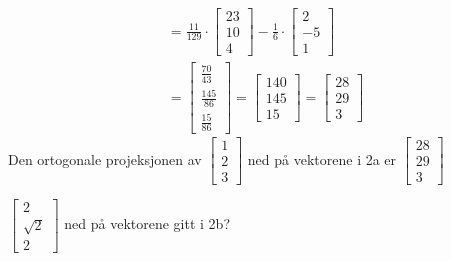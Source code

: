 \documentclass[11pt, a4paper, norsk]{NTNUoving}
\begin{document}
\begin{oppgave}
\begin{punkt}
\begin{align*}
                     &= \frac{11}{129} \cdot \begin{bmatrix}
                         23 \\
                         10 \\
                         4
                     \end{bmatrix} - \frac{1}{6} \cdot \begin{bmatrix}
                         2 \\
                         -5 \\
                         1
                     \end{bmatrix}
                     \\
                     &= \begin{bmatrix}
                         \frac{70}{43} \\
                         \frac{145}{86} \\
                         \frac{15}{86}
                     \end{bmatrix} = \begin{bmatrix}
                         140 \\
                         145 \\
                         15
                     \end{bmatrix} = \begin{bmatrix}
                         28 \\
                         29 \\
                         3
                     \end{bmatrix}
           \end{align*}
           Den ortogonale projeksjonen av $\begin{bmatrix}
               1 \\
               2 \\
               3
           \end{bmatrix}$ ned på vektorene i 2a er $\begin{bmatrix}
               28 \\
               29 \\
               3
           \end{bmatrix}$
       \end{punkt}
       \begin{punkt}
           $\begin{bmatrix}
               2 \\
               \sqrt{2} \\
               2
           \end{bmatrix}$ ned på vektorene gitt i 2b?


\end{punkt}
\end{oppgave}
\end{document}
